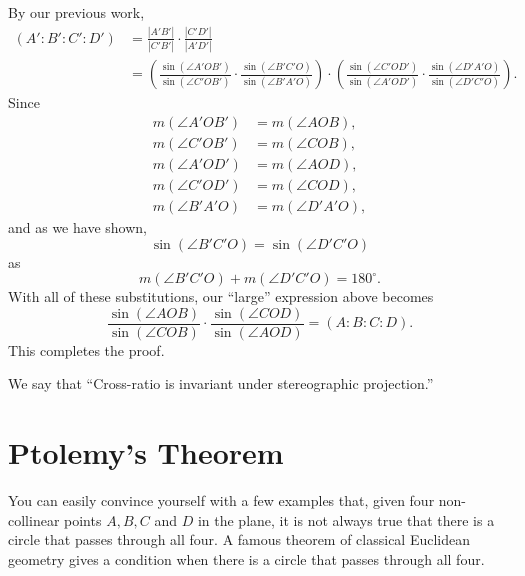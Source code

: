 \documentclass[newpage,hints,handout]{ximera}
\begin{document}
\begin{problem}
\begin{freeResponse}
By our previous work, 
\begin{align*}
(A':B':C':D') &=\frac{|A'B'|}{|C'B'|}\cdot\frac{|C'D'|}{|A'D'|}\\
&=\left(\frac{\sin(\angle A'OB')}{\sin(\angle C'OB')}\cdot 
\frac{
\sin(\angle B'C'O)
}{
\sin(\angle B'A'O)
}\right) 
\cdot\left(\frac{
\sin(\angle C'OD')
}{
\sin(\angle A'OD')
}\cdot\frac{\sin(\angle D'A'O)}{\sin(\angle D'C'O)}\right).
\end{align*}
Since 
\begin{align*}
m(\angle A'OB') &= m(\angle AOB),\\
m(\angle C'OB') &= m(\angle COB),\\
m(\angle A'OD') &= m(\angle AOD),\\
m(\angle C'OD') &= m(\angle COD),\\
m(\angle B'A'O) &= m(\angle D'A'O),
\end{align*}
and as we have shown, 
\[
\sin(\angle B'C'O) = \sin(\angle D'C'O)
\]
as 
\[
m(\angle B'C'O) + m(\angle D'C'O) = 180^\circ.
\]
With all of these substitutions, our ``large'' expression above becomes
\[
\frac{\sin(\angle AOB)}{\sin(\angle COB)} \cdot\frac{
\sin(\angle COD)
}{
\sin(\angle AOD)
} = (A:B:C:D). 
\]
This completes the proof. 
\end{freeResponse}
\end{problem}


We say that ``Cross-ratio is invariant under stereographic
projection.''







\section{Ptolemy's Theorem}

You can easily convince yourself with a few examples that, given four
non-collinear points $A,B,C$ and $D$ in the plane, it is not always
true that there is a circle that passes through all four. A famous
theorem of classical Euclidean geometry gives a condition when there
is a circle that passes through all four.
\end{document}
